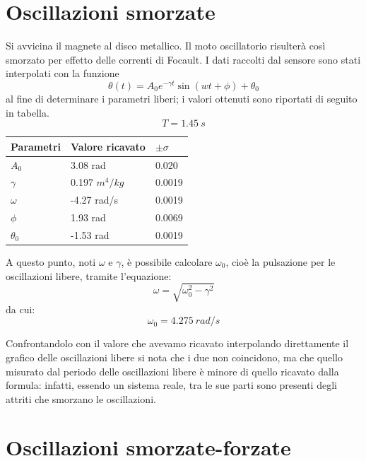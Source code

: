 \section{Oscillazioni smorzate}

Si avvicina il magnete al disco metallico. Il moto oscillatorio risulterà così smorzato per effetto delle correnti di Focault.
I dati raccolti dal sensore sono stati interpolati con la funzione
\begin{equation}\label{eq:theta}
\theta (t) = A_0 e^{- \gamma t} \sin(wt+\phi)+\theta_0
\end{equation}
al fine di determinare i parametri liberi; i valori ottenuti sono riportati di seguito in tabella.\\

$$T=1.45\ s$$

\begin{center}
\begin{tabular}{l|l|l}
Parametri & Valore ricavato & $ \pm \sigma$ \\
\midrule
$A_0$ & 3.08 rad & 0.020\\
$\gamma$ & 0.197 $m^4/kg$& 0.0019\\
$\omega$ & -4.27 rad/s& 0.0019\\
$\phi$ & 1.93 rad & 0.0069 \\
$\theta_0$ & -1.53 rad& 0.0019 \\
\end{tabular}
\end{center}

A questo punto, noti $\omega$ e $\gamma$, è possibile calcolare $ \omega_0 $, cioè la pulsazione per le oscillazioni libere, tramite l'equazione:
\begin{equation}\label{eq:omega}
\omega = \sqrt{\omega_0^2 - \gamma^2}
\end{equation} da cui:
$$\omega_0 = 4.275\ rad/s$$

Confrontandolo con il valore che avevamo ricavato interpolando direttamente il grafico delle oscillazioni libere si nota che i due non coincidono, ma che quello misurato dal periodo delle oscillazioni libere è minore di quello ricavato dalla formula: infatti, essendo un sistema reale, tra le sue parti sono presenti degli attriti che smorzano le oscillazioni.

\section{Oscillazioni smorzate-forzate}

